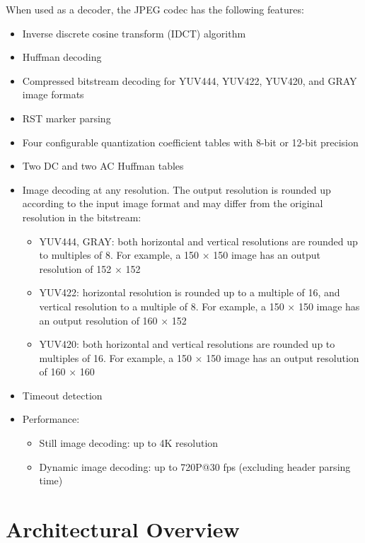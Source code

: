 \documentclass[main\_\_EN.tex]{subfiles}
\begin{document}
When used as a decoder, the JPEG codec has the following features:
\begin{itemize}
    \item Inverse discrete cosine transform (IDCT) algorithm
    \item Huffman decoding
    \item Compressed bitstream decoding for YUV444, YUV422, YUV420, and GRAY image formats
    \item RST marker parsing
    \item Four configurable quantization coefficient tables with 8-bit or 12-bit precision
    \item Two DC and two AC Huffman tables
    \item Image decoding at any resolution. The output resolution is rounded up according to the input image format and may differ from the original resolution in the bitstream:
        \begin{itemize}
        \item YUV444, GRAY: both horizontal and vertical resolutions are rounded up to multiples of 8. For example, a 150 × 150 image has an output resolution of 152 × 152
        \item YUV422: horizontal resolution is rounded up to a multiple of 16, and vertical resolution to a multiple of 8. For example, a 150 × 150 image has an output resolution of 160 × 152
        \item YUV420: both horizontal and vertical resolutions are rounded up to multiples of 16. For example, a 150 × 150 image has an output resolution of 160 × 160
        \end{itemize}
    \item Timeout detection
    \item Performance:
    \begin{itemize}
        \item Still image decoding: up to 4K resolution
        \item Dynamic image decoding: up to 720P@30 fps (excluding header parsing time)
    \end{itemize}
\end{itemize}



\section{Architectural Overview}
\label{sec:jpegcodec-arch-overview}
\end{document}
